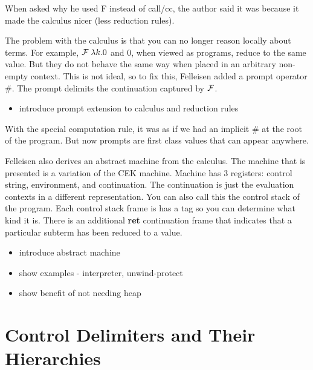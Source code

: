 \documentclass[letterpaper]{llncs}
\begin{document}
When asked why he used F instead of call/cc, the author said it was because it made the calculus nicer (less reduction rules).	


The problem with the calculus is that you can no longer reason locally about terms. For example, $  \mathcal{F}  \;  \lambda k.0  $ and 0, when viewed as programs, reduce to the same value. But they do not behave the same way when placed in an arbitrary non-empty context. This is not ideal, so to fix this, Felleisen added a prompt operator \#. The prompt delimits the continuation captured by $ \mathcal{F} $.

\begin{itemize}
	\item introduce prompt extension to calculus and reduction rules
\end{itemize}

With the special computation rule, it was as if we had an implicit \# at the root of the program. But now prompts are first class values that can appear anywhere.

Felleisen also derives an abstract machine from the calculus. The machine that is presented is a variation of the CEK machine. Machine has 3 registers: control string, environment, and continuation. The continuation is just the evaluation contexts in a different representation. You can also call this the control stack of the program. Each control stack frame is has a tag so you can determine what kind it is. There is an additional \textbf{ret} continuation frame that indicates that a particular subterm has been reduced to a value.

\begin{itemize}	
	\item introduce abstract machine
\end{itemize}

\begin{itemize}	
	\item show examples - interpreter, unwind-protect
	\item show benefit of not needing heap
\end{itemize}




\section*{Control Delimiters and Their Hierarchies}%
\end{document}
